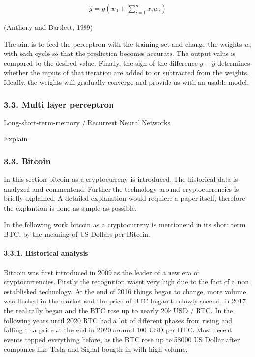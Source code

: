 \documentclass[
]{article}
\begin{document}
\begin{align} \label{eq:perceptron}
\hat{y}=g(w_{0}+\sum_{i=1}^{n}x_{i}w_{i})
\end{align}

(Anthony and Bartlett, 1999)

The aim is to feed the perceptron with the training set and change the
weights \(w_{i}\) with each cycle so that the prediction becomes
accurate. The output value is compared to the desired value. Finally,
the sign of the difference \(y-\hat{y}\) determines whether the inputs
of that iteration are added to or subtracted from the weights. Ideally,
the weights will gradually converge and provide us with an usable model.

\hypertarget{multi-layer-perceptron}{%
\subsubsection{3.3. Multi layer
perceptron}\label{multi-layer-perceptron}}

Long-short-term-memory / Recurrent Neural Networks

Explain.

\hypertarget{bitcoin}{%
\subsubsection{3.3. Bitcoin}\label{bitcoin}}

In this section bitcoin as a cryptocurreny is introduced. The historical
data is analyzed and commentend. Further the technology around
cryptocurrencies is briefly explained. A detailed explanation would
requiere a paper itself, therefore the explantion is done as simple as
possible.

In the following work bitcoin as a cryptocurreny is mentionend in its
short term BTC, by the meaning of US Dollars per Bitcoin.

\hypertarget{historical-analysis}{%
\paragraph{3.3.1. Historical analysis}\label{historical-analysis}}

Bitcoin was first introduced in 2009 as the leader of a new era of
cryptocurrencies. Firstly the recognition wasnt very high due to the
fact of a non established technology. At the end of 2016 things began to
change, more volume was flushed in the market and the price of BTC began
to slowly ascend. in 2017 the real rally began and the BTC rose up to
nearly 20k USD / BTC. In the following years until 2020 BTC had a lot of
different phases from rising and falling to a price at the end in 2020
around 100 USD per BTC. Most recent events topped everything before, as
the BTC rose up to 58000 US Dollar after companies like Tesla and Signal
bougth in with high volume.
\end{document}
